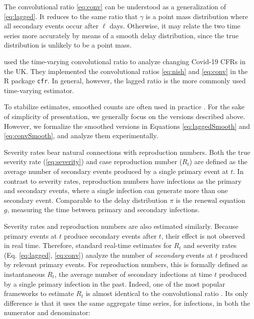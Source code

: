 \documentclass{article}
\begin{document}
\noindent The convolutional ratio \eqref{eq:conv} can be understood as a generalization of \eqref{eq:lagged}. It reduces to the same ratio that ${\gamma}$ is a point mass distribution where all secondary events occur after $\ell$ days. 
Otherwise, it may relate the two time series more accurately by means of a smooth delay distribution, since the true distribution is unlikely to be a point mass. 

\citet{cfr_package} used the time-varying convolutional ratio to analyze changing Covid-19 CFRs in the UK. They implemented the convolutional ratios \eqref{eq:nish} and \eqref{eq:conv} in the R package \texttt{cfr}. In general, however, the lagged ratio is the more commonly used time-varying estimator.


To stabilize estimates, smoothed counts are often used in practice \citep{germany,timevar_ifr,LIU2023100350}. For the sake of simplicity of presentation, we generally focus on the versions described above. However, we formalize the smoothed versions in Equations \eqref{eq:laggedSmooth} and \eqref{eq:convSmooth}, and analyze them experimentally.

Severity rates bear natural connections with reproduction numbers. Both the true severity rate (\eqref{eq:severity}) and case reproduction number ($R_t$) are defined as the average number of secondary events produced by a single primary event at $t$. In contrast to severity rates, reproduction numbers have infections as the primary and secondary events, where a single infection can generate more than one secondary event. Comparable to the delay distribution $\pi$ is the renewal equation $g$, measuring the time between primary and secondary infections.

Severity rates and reproduction numbers are also estimated similarly. Because primary events at $t$ produce secondary events after $t$, their effect is not observed in real time. Therefore, standard real-time estimates for $R_t$ and severity rates (Eq. \eqref{eq:lagged}, \eqref{eq:conv}) analyze the number of \textit{secondary} events at $t$ produced by relevant primary events. For reproduction numbers, this is formally defined as instantaneous $R_t$, the average number of secondary infections at time $t$ produced by a single primary infection in the past. Indeed, one of the most popular frameworks to estimate $R_t$ is almost identical to the convolutional ratio \citep{fraser2007,wallinga2007how,cori2013new,rtestim}. Its only difference is that it uses the same aggregate time series, for infections, in both the numerator and denominator:
\end{document}
